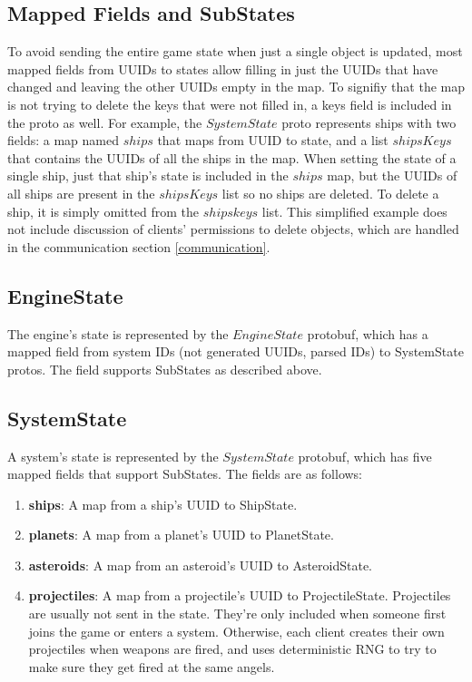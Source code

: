\documentclass{article}
\begin{document}
\subsection{Mapped Fields and SubStates}
To avoid sending the entire game state when just a single object is updated, most mapped fields from UUIDs to states allow filling in just the UUIDs that have changed and leaving the other UUIDs empty in the map. To signifiy that the map is not trying to delete the keys that were not filled in, a keys field is included in the proto as well. For example, the $SystemState$ proto represents ships with two fields: a map named $ships$ that maps from UUID to state, and a list $shipsKeys$ that contains the UUIDs of all the ships in the map. When setting the state of a single ship, just that ship's state is included in the $ships$ map, but the UUIDs of all ships are present in the $shipsKeys$ list so no ships are deleted. To delete a ship, it is simply omitted from the $shipskeys$ list. This simplified example does not include discussion of clients' permissions to delete objects, which are handled in the communication section \ref{communication}.

\subsection{EngineState}
The engine's state is represented by the $EngineState$ protobuf, which has a mapped field from system IDs (not generated UUIDs, parsed IDs) to SystemState protos. The field supports SubStates as described above.

\subsection{SystemState}
A system's state is represented by the $SystemState$ protobuf, which has five mapped fields that support SubStates. The fields are as follows:
\begin{enumerate}
\item[] \textbf{ships}: A map from a ship's UUID to ShipState.
\item[] \textbf{planets}: A map from a planet's UUID to PlanetState.
\item[] \textbf{asteroids}: A map from an asteroid's UUID to AsteroidState.
\item[] \textbf{projectiles}: A map from a projectile's UUID to ProjectileState. Projectiles are usually not sent in the state. They're only included when someone first joins the game or enters a system. Otherwise, each client creates their own projectiles when weapons are fired, and uses deterministic RNG to try to make sure they get fired at the same angels.
  


\end{enumerate}
\end{document}
